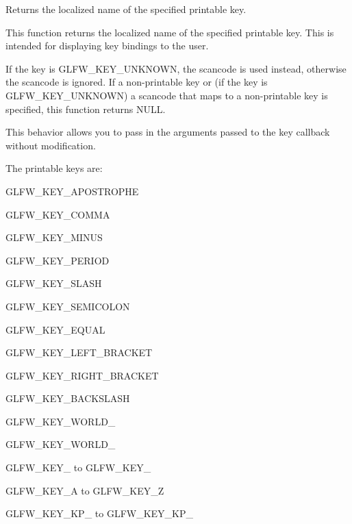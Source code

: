 Returns the localized name of the specified printable key. 

This function returns the localized name of the specified printable key. This is intended for displaying key bindings to the user.

If the key is {\ttfamily G\+L\+F\+W\+\_\+\+K\+E\+Y\+\_\+\+U\+N\+K\+N\+O\+WN}, the scancode is used instead, otherwise the scancode is ignored. If a non-\/printable key or (if the key is {\ttfamily G\+L\+F\+W\+\_\+\+K\+E\+Y\+\_\+\+U\+N\+K\+N\+O\+WN}) a scancode that maps to a non-\/printable key is specified, this function returns {\ttfamily N\+U\+LL}.

This behavior allows you to pass in the arguments passed to the key callback without modification.

The printable keys are\+:
\begin{DoxyItemize}
\item {\ttfamily G\+L\+F\+W\+\_\+\+K\+E\+Y\+\_\+\+A\+P\+O\+S\+T\+R\+O\+P\+HE}
\item {\ttfamily G\+L\+F\+W\+\_\+\+K\+E\+Y\+\_\+\+C\+O\+M\+MA}
\item {\ttfamily G\+L\+F\+W\+\_\+\+K\+E\+Y\+\_\+\+M\+I\+N\+US}
\item {\ttfamily G\+L\+F\+W\+\_\+\+K\+E\+Y\+\_\+\+P\+E\+R\+I\+OD}
\item {\ttfamily G\+L\+F\+W\+\_\+\+K\+E\+Y\+\_\+\+S\+L\+A\+SH}
\item {\ttfamily G\+L\+F\+W\+\_\+\+K\+E\+Y\+\_\+\+S\+E\+M\+I\+C\+O\+L\+ON}
\item {\ttfamily G\+L\+F\+W\+\_\+\+K\+E\+Y\+\_\+\+E\+Q\+U\+AL}
\item {\ttfamily G\+L\+F\+W\+\_\+\+K\+E\+Y\+\_\+\+L\+E\+F\+T\+\_\+\+B\+R\+A\+C\+K\+ET}
\item {\ttfamily G\+L\+F\+W\+\_\+\+K\+E\+Y\+\_\+\+R\+I\+G\+H\+T\+\_\+\+B\+R\+A\+C\+K\+ET}
\item {\ttfamily G\+L\+F\+W\+\_\+\+K\+E\+Y\+\_\+\+B\+A\+C\+K\+S\+L\+A\+SH}
\item {\ttfamily G\+L\+F\+W\+\_\+\+K\+E\+Y\+\_\+\+W\+O\+R\+L\+D\+\_}
\item {\ttfamily G\+L\+F\+W\+\_\+\+K\+E\+Y\+\_\+\+W\+O\+R\+L\+D\+\_}
\item {\ttfamily G\+L\+F\+W\+\_\+\+K\+E\+Y\+\_} to {\ttfamily G\+L\+F\+W\+\_\+\+K\+E\+Y\+\_}
\item {\ttfamily G\+L\+F\+W\+\_\+\+K\+E\+Y\+\_\+A} to {\ttfamily G\+L\+F\+W\+\_\+\+K\+E\+Y\+\_\+Z}
\item {\ttfamily G\+L\+F\+W\+\_\+\+K\+E\+Y\+\_\+\+K\+P\+\_} to {\ttfamily G\+L\+F\+W\+\_\+\+K\+E\+Y\+\_\+\+K\+P\+\_}

\end{DoxyItemize}
